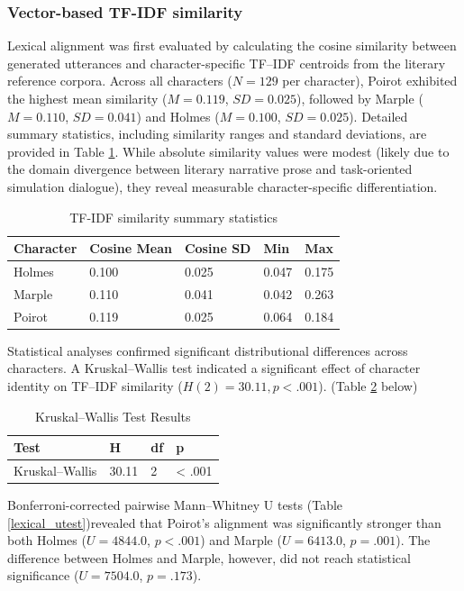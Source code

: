 \documentclass{article}
\begin{document}
\subsubsection{Vector-based TF-IDF similarity}

Lexical alignment was first evaluated by calculating the cosine similarity between generated utterances and character-specific TF–IDF centroids from the literary reference corpora. Across all characters ($N=129$ per character), Poirot exhibited the highest mean similarity ($M=0.119$, $SD=0.025$), followed by Marple ($M=0.110$, $SD=0.041$) and Holmes ($M=0.100$, $SD=0.025$). Detailed summary statistics, including similarity ranges and standard deviations, are provided in Table \ref{lexical_tfidf}. While absolute similarity values were modest (likely due to the domain divergence between literary narrative prose and task-oriented simulation dialogue), they reveal measurable character-specific differentiation.

\begin{table}[H]
\centering
\begin{tabular}{l l l l l}\toprule
Character & Cosine Mean& Cosine SD& Min & Max \\\midrule
Holmes & 0.100 & 0.025 & 0.047 & 0.175 \\
Marple & 0.110 & 0.041 & 0.042 & 0.263 \\
Poirot & 0.119 & 0.025 & 0.064 & 0.184 \\ \bottomrule
\end{tabular}
\caption{TF-IDF similarity summary statistics}
\label{lexical_tfidf}
\end{table}

Statistical analyses confirmed significant distributional differences across characters. A Kruskal–Wallis test indicated a significant effect of character identity on TF–IDF similarity ($H(2)=30.11,p<.001$). (Table \ref{lexical_kwallis} below)

\begin{table}[H]
\centering
\begin{tabular}{l l l l}\toprule
Test & H & df & p \\\midrule
Kruskal–Wallis & 30.11 & 2 & < .001 \\ \bottomrule
\end{tabular}
\caption{Kruskal–Wallis Test Results}
\label{lexical_kwallis}
\end{table}

Bonferroni-corrected pairwise Mann–Whitney U tests (Table \ref{lexical_utest})revealed that Poirot’s alignment was significantly stronger than both Holmes ($U=4844.0$, $p<.001$) and Marple ($U=6413$.0, $p=.001$). The difference between Holmes and Marple, however, did not reach statistical significance ($U=7504.0$, $p=.173$).
\end{document}
